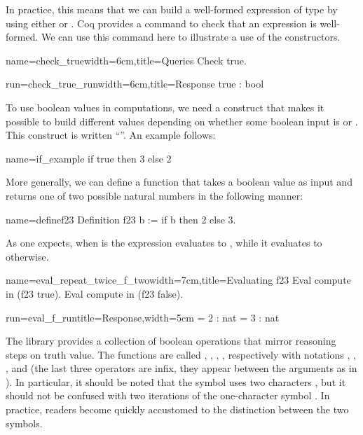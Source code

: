 In practice, this means that we can build a well-formed expression of
type  by using either  or .  Coq provides a
command to check that an expression is well-formed.  We can use this
command here to illustrate a use of the constructors.

\begin{coq}{name=check_true}{width=6cm,title=Queries}
Check true.
\end{coq}
\begin{coqout}{run=check_true_run}{width=6cm,title=Response}
true : bool
\end{coqout}

To use boolean values in computations, we need a construct that makes
it possible to build different values depending on whether some
boolean input is  or .  This construct is written
``''.  An example follows:

\begin{coq}{name=if_example}{}
if true then 3 else 2
\end{coq}
More generally, we can define a function that takes a boolean value as
input and returns one of two possible natural numbers in the following
manner:

\begin{coq}{name=definef23}{}
Definition f23 b := if b then 2 else 3.
\end{coq}

As one expects, when  is  the expression
 evaluates to , while it evaluates to  otherwise.

\begin{coq}{name=eval_repeat_twice_f_two}{width=7cm,title=Evaluating f23}
Eval compute in (f23 true).
Eval compute in (f23 false).
\end{coq}
\begin{coqout}{run=eval_f_run}{title=Response,width=5cm}
  = 2 : nat
  = 3 : nat
\end{coqout}

The \mcbMC{} library provides a collection of boolean operations that
mirror reasoning steps on truth value.  The functions are called
, ,  , , respectively with notations
\C{\~\~},  \C{||}, \C{&&}, and \C{==>} (the last three operators are
infix, they appear between the arguments as in ).
  In
particular, it should be
noted that the symbol \C{\~\~} uses two characters \C{\~}, but it should
not be confused with two iterations of the one-character symbol
\C{\~}.  In practice, readers become quickly accustomed to the
distinction between the two symbols.

